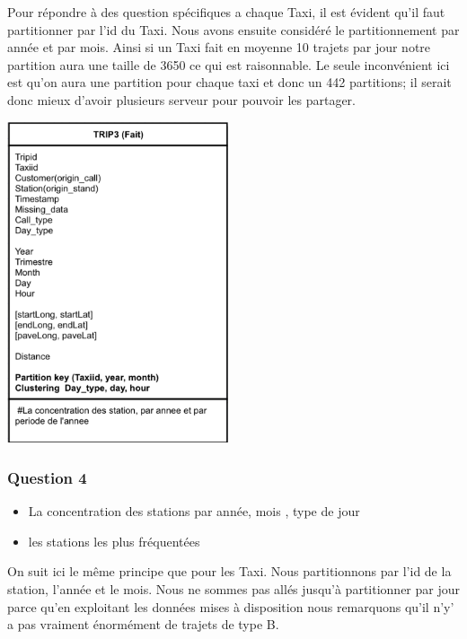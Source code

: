 \documentclass[]{report}
\begin{document}
	Pour répondre à des question spécifiques a chaque Taxi, il est évident qu’il faut partitionner par l'id du Taxi. Nous avons ensuite considéré le partitionnement par année et par mois. Ainsi si un Taxi fait en moyenne 10 trajets par jour notre partition aura une taille de 3650 ce qui est raisonnable. Le seule inconvénient ici est qu'on aura une partition pour chaque taxi et donc un 442 partitions; il serait donc mieux d'avoir plusieurs serveur pour pouvoir les partager.
	
	\begin{center}
		\includegraphics[width=65mm]{Figures/Trip3.png}
	\end{center}
	\subsubsection{Question 4}
	\begin{itemize}
		\item La concentration des stations par année, mois , type de jour
		\item  les stations les plus fréquentées
	\end{itemize}
	On suit ici le même principe que pour les Taxi. Nous partitionnons par l'id de la station, l'année et le mois. Nous ne sommes pas allés jusqu'à partitionner par  jour parce qu'en exploitant les données mises à disposition nous remarquons qu'il n'y' a pas vraiment énormément de trajets de type B.
	
\end{document}
